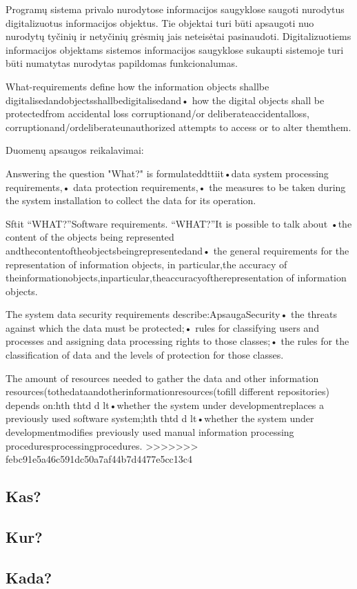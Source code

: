 \documentclass{VUMIFPSkursinis}
\begin{document}
Programų sistema privalo nurodytose informacijos saugyklose saugoti
nurodytus digitalizuotus informacijos objektus. Tie objektai turi būti apsaugoti
nuo nurodytų tyčinių ir netyčinių grėsmių jais neteisėtai pasinaudoti.
Digitalizuotiems informacijos objektams sistemos informacijos saugyklose
sukaupti sistemoje turi būti numatytas nurodytas papildomas
funkcionalumas.


What-requirements define how the information objects shallbe digitalisedandobjectsshallbedigitalisedand•  how the digital objects shall be protectedfrom accidental loss  corruptionand/or deliberateaccidentalloss, corruptionand/ordeliberateunauthorized attempts to access or to alter themthem.

Duomenų apsaugos reikalavimai: 

Answering the question "What?" is formulateddttiit•data system processing requirements,•  data protection requirements,•  the measures to be taken during the system installation to collect the data for its operation.

Sftit  “WHAT?”Software requirements. “WHAT?”It is possible to talk about •the content of the objects being represented andthecontentoftheobjectsbeingrepresentedand•   the general requirements for the representation of information objects, in particular,the accuracy of theinformationobjects,inparticular,theaccuracyoftherepresentation of information objects.

The system data security requirements describe:ApsaugaSecurity•   the threats against which the data must be protected;•   rules for classifying users and processes and assigning data processing rights to those classes;•   the rules for the classification of data and the levels of protection for those classes.

The amount of resources needed to gather the data and other information resources(tothedataandotherinformationresources(tofill different repositories) depends on:hth  thtd  d    lt•whether the system under developmentreplaces a previously used software system;hth  thtd  d    lt•whether the system under developmentmodifies previously used manual information processing proceduresprocessingprocedures.
>>>>>>> febc91e5a46c591dc50a7af44b7d4477e5cc13c4

\subsection{Kas?}\label{sec:PSReqWho}
\subsection{Kur?}\label{sec:PSReqWhere}
\subsection{Kada?}\label{sec:PSReqWhen}
\end{document}
